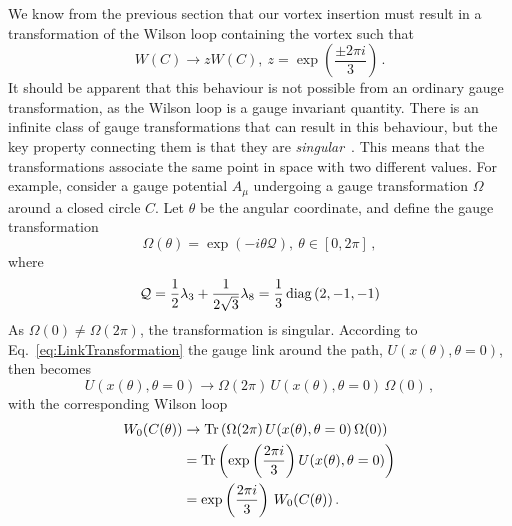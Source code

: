 We know from the previous section that our vortex insertion must result in a transformation of the Wilson loop containing the vortex such that
%
\begin{equation}
W(C)\rightarrow z W(C),~z = \exp\left(\frac{\pm2\pi i}{3}\right)\, .
\end{equation} 
%
It should be apparent that this behaviour is not possible from an ordinary gauge transformation, as the Wilson loop is a gauge invariant quantity. There is an infinite class of gauge transformations that can result in this behaviour, but the key property connecting them is that they are \textit{singular}~\cite{'tHooft:1977hy}. This means that the transformations associate the same point in space with two different values. For example, consider a gauge potential $A_\mu$ undergoing a gauge transformation $\Omega$ around a closed circle $C$. Let $\theta$ be the angular coordinate, and define the gauge transformation
%
\begin{equation}
\Omega(\theta) = \exp\left(-i\theta \mathcal{Q}\right),~\theta\in [0,2\pi]\, ,
\label{eq:SingularGT}
\end{equation}
%
where
%
\begin{equation}
\mathcal{Q} = \frac{1}{2}\lambda_3 +\frac{1}{2\sqrt{3}}\lambda_8 = \frac{1}{3}\operatorname{diag}\left(2,-1,-1\right)\label{eq:Q}
\end{equation}
As $\Omega(0) \neq \Omega(2\pi)$, the transformation is singular. According to Eq.~\ref{eq:LinkTransformation} the gauge link around the path, $U(x(\theta),\theta=0)$, then becomes
%
\begin{equation}
U(x(\theta),\theta=0) \rightarrow \Omega(2\pi)\,U(x(\theta),\theta=0)\,\Omega(0)\, ,
\end{equation}
%
with the corresponding Wilson loop
%
\begin{align}
W_0(C(\theta)) &\rightarrow \operatorname{Tr}\left( \Omega(2\pi)\,U(x(\theta),\theta=0)\,\Omega(0)\right)\\
&=\operatorname{Tr}\left(\exp\left(\frac{2\pi i}{3}\right)U(x(\theta),\theta=0)\right)\\
&=\exp\left(\frac{2\pi i}{3}\right)\,W_0(C(\theta))\, .
\end{align}
